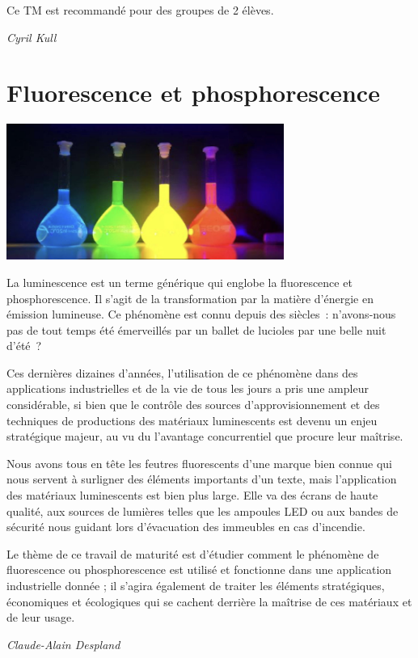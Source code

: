 \documentclass[
  10pt,
  french,
  a5paper,
  openany]{book}
\newenvironment{signature}{\begin{flushright}}{\end{flushright}}
\begin{document}
Ce TM est recommandé pour des groupes de 2 élèves.

\begin{signature}
\emph{Cyril Kull}

\end{signature}

\hypertarget{fluorescence-et-phosphorescence}{%
\chapter{Fluorescence et phosphorescence}\label{fluorescence-et-phosphorescence}}

\begin{center}
\includegraphics[width=\textwidth,height=12em]{images/fluorescence-et-phosphorescence.jpg}

\end{center}


La luminescence est un terme générique qui englobe la fluorescence et phosphorescence. Il s'agit de la transformation par la matière d'énergie en émission lumineuse. Ce phénomène est connu depuis des siècles~: n'avons-nous pas de tout temps été émerveillés par un ballet de lucioles par une belle nuit d'été~?

Ces dernières dizaines d'années, l'utilisation de ce phénomène dans des applications industrielles et de la vie de tous les jours a pris une ampleur considérable, si bien que le contrôle des sources d'approvisionnement et des techniques de productions des matériaux luminescents est devenu un enjeu stratégique majeur, au vu du l'avantage concurrentiel que procure leur maîtrise.

Nous avons tous en tête les feutres fluorescents d'une marque bien connue qui nous servent à surligner des éléments importants d'un texte, mais l'application des matériaux luminescents est bien plus large. Elle va des écrans de haute qualité, aux sources de lumières telles que les ampoules LED ou aux bandes de sécurité nous guidant lors d'évacuation des immeubles en cas d'incendie.

\clearpage

Le thème de ce travail de maturité est d'étudier comment le phénomène de fluorescence ou phosphorescence est utilisé et fonctionne dans une application industrielle donnée ; il s'agira également de traiter les éléments stratégiques, économiques et écologiques qui se cachent derrière la maîtrise de ces matériaux et de leur usage.

\begin{signature}
\emph{Claude-Alain Despland}

\end{signature}
\end{document}
